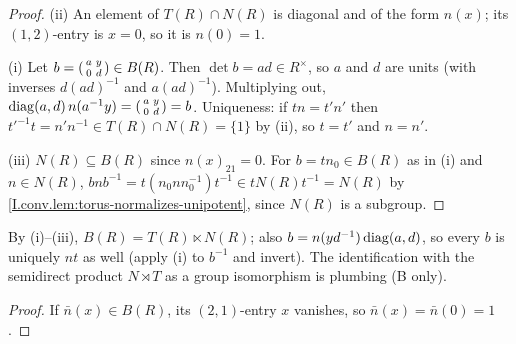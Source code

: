 \begin{theorem}[$B=T\ltimes N$]
\end{theorem}
\begin{proof}
(ii) An element of $T(R)\cap N(R)$ is diagonal and of the form $n(x)$; its $(1,2)$-entry is $x=0$, so it is $n(0)=1$.

(i) Let $b=\begin{psmallmatrix}a&y\\0&d\end{psmallmatrix}\in B(R)$. Then $\det b=ad\in R^\times$, so $a$ and $d$ are
units (with inverses $d(ad)^{-1}$ and $a(ad)^{-1}$). Multiplying out,
$\operatorname{diag}(a,d)\,n(a^{-1}y)=\begin{psmallmatrix}a&y\\0&d\end{psmallmatrix}=b$. Uniqueness: if $tn=t'n'$ then
$t'^{-1}t=n'n^{-1}\in T(R)\cap N(R)=\{1\}$ by (ii), so $t=t'$ and $n=n'$.

(iii) $N(R)\subseteq B(R)$ since $n(x)_{21}=0$. For $b=tn_0\in B(R)$ as in (i) and $n\in N(R)$,
$bnb^{-1}=t(n_0nn_0^{-1})t^{-1}\in tN(R)t^{-1}=N(R)$ by \cref{I.conv.lem:torus-normalizes-unipotent}, since
$N(R)$ is a subgroup.
\end{proof}
\noindent By (i)--(iii), $B(R)=T(R)\ltimes N(R)$; also $b=n(yd^{-1})\operatorname{diag}(a,d)$, so every $b$ is uniquely $nt$ as
well (apply (i) to $b^{-1}$ and invert). The identification with the semidirect product $N\rtimes T$ as a group isomorphism
is plumbing (B only).

\begin{lemma}[$B\cap\Nbar=1$]
\end{lemma}
\begin{proof}
If $\bar n(x)\in B(R)$, its $(2,1)$-entry $x$ vanishes, so $\bar n(x)=\bar n(0)=1$.
\end{proof}

